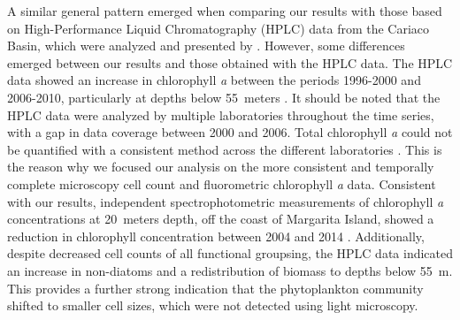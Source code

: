 \documentclass[draft]{agujournal2019}
\begin{document}
    A similar general pattern emerged when comparing our results with those based on High-Performance Liquid Chromatography (HPLC) data from the Cariaco Basin, which were analyzed and presented by . However, some differences emerged between our results and those obtained with the HPLC data. The HPLC data showed an increase in chlorophyll \textit{a} between the periods 1996-2000 and 2006-2010, particularly at depths below \qty{55}{meters} \cite{pinckney_phytoplankton_2015}. It should be noted that the HPLC data were analyzed by multiple laboratories throughout the time series, with a gap in data coverage between 2000 and 2006. Total chlorophyll \textit{a} could not be quantified with a consistent method across the different laboratories \cite{pinckney_phytoplankton_2015}. This is the reason why we focused our analysis on the more consistent and temporally complete microscopy cell count and fluorometric chlorophyll \textit{a} data.
    Consistent with our results, independent spectrophotometric measurements of chlorophyll \textit{a} concentrations at \qty{20}{meters} depth, off the coast of Margarita Island, showed a reduction in chlorophyll concentration between 2004 and 2014 \cite{gomez_gaspar_variacion_2025}.
    Additionally, despite decreased cell counts of all functional groupsing, the HPLC data indicated an increase in non-diatoms and a redistribution of biomass to depths below \qty{55}{\meter}. This provides a further strong indication that the phytoplankton community shifted to smaller cell sizes, which were not detected using light microscopy.
    
\end{document}
